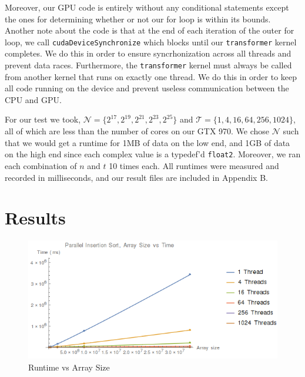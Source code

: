 \documentclass[notitlepage, twocolumn]{article}
\newcommand{\set}[1]{\lbrace #1 \rbrace}
\begin{document}
Moreover, our GPU code is entirely without any conditional statements except the ones for determining whether or not our for loop is within its bounds.
Another note about the code is that at the end of each iteration of the outer for loop, we call \verb|cudaDeviceSynchronize| which blocks until our \verb|transformer| kernel completes.
We do this in order to ensure syncrhonization across all threads and prevent data races.
Furthermore, the \verb|transformer| kernel must always be called from another kernel that runs on exactly one thread.
We do this in order to keep all code running on the device and prevent useless communication between the CPU and GPU.

For our test we took, $\mathcal{N}=\set{2^{17},2^{19},2^{21},2^{23},2^{25}}$ and $\mathcal{T}=\set{1,4,16,64,256,1024}$, all of which are less than the number of cores on our GTX 970.
We chose $\mathcal{N}$ such that we would get a runtime for 1MB of data on the low end, and 1GB of data on the high end since each complex value is a typedef'd \verb|float2|.
Moreover, we ran each combination of $n$ and $t$ 10 times each.
All runtimes were measured and recorded in milliseconds, and our result files are included in Appendix B.

\section{Results}

\begin{figure}\label{results}
	\centering

	\includegraphics[scale=0.35]{results.png}
	\caption{Runtime vs Array Size}
\end{figure}
\end{document}
